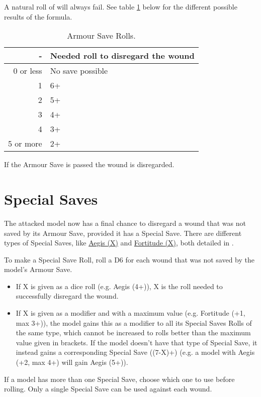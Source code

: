 A natural roll of  will always fail. See table \ref{table/armour_save_roll} below for the different possible results of the formula.

\begin{table}[!htbp]
\centering
  \begin{tabular}{r l}
    \Armour{} - \AP{} & Needed roll to disregard the wound \\
    \midrule
    0 or less & No save possible \\
    1 & 6+ \\
    2 & 5+ \\
    3 & 4+ \\
    4 & 3+ \\
    5 or more & 2+ \\
  \end{tabular}
 \caption{Armour Save Rolls.}
 \label{table/armour_save_roll}
\end{table}

If the Armour Save is passed the wound is disregarded.

\section{Special Saves}
\label{special_saves}

The attacked model now has a final chance to disregard a wound that was not saved by its Armour Save, provided it has a Special Save. There are different types of Special Saves, like \hyperref[aegis]{Aegis (X)} and \hyperref[fortitude]{Fortitude (X)}, both detailed in .

To make a Special Save Roll, roll a D6 for each wound that was not saved by the model's Armour Save.
\begin{itemize}[label={-}]
\item If X is given as a dice roll (e.g. Aegis (4+)), X is the roll needed to successfully disregard the wound.
\item If X is given as a modifier and with a maximum value (e.g. Fortitude (+1, max 3+)), the model gains this as a modifier to all its Special Saves Rolls of the same type, which cannot be increased to rolls better than the maximum value given in brackets. If the model doesn't have that type of Special Save, it instead gains a corresponding Special Save ((7-X)+) (e.g. a model with Aegis (+2, max 4+) will gain Aegis (5+)).
\end{itemize}

If a model has more than one Special Save, choose which one to use before rolling. Only a single Special Save can be used against each wound.

